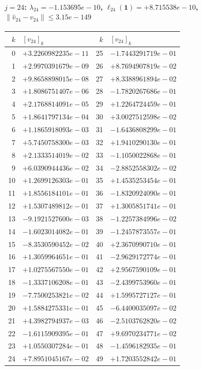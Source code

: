 \documentclass[11pt]{article}
\begin{document}
\paragraph{$j = 24$: $\lambda_{24} = -1.153695e-10$, \quad $\ell_{24}(\mathbf{1}) = +8.715538e-10$, \quad $\|\hat v_{24} - v_{24}\| \leq 3.15e-149$}
\begin{center}
{\footnotesize
\begin{tabular}{r@{\;\;}l@{\quad}r@{\;\;}l}
\toprule
$k$ & $[v_{24}]_k$ & $k$ & $[v_{24}]_k$ \\
\midrule
0 & $+3.2260982235e-11$ & 25 & $-1.7443291719e-01$ \\
1 & $+2.9970391679e-09$ & 26 & $+8.7694907819e-02$ \\
2 & $+9.8658898015e-08$ & 27 & $+8.3388961894e-02$ \\
3 & $+1.8086751407e-06$ & 28 & $-1.7820267686e-01$ \\
4 & $+2.1768814091e-05$ & 29 & $+1.2264724459e-01$ \\
5 & $+1.8641797134e-04$ & 30 & $+3.0027512598e-02$ \\
6 & $+1.1865918093e-03$ & 31 & $-1.6436808299e-01$ \\
7 & $+5.7450758300e-03$ & 32 & $+1.9410290130e-01$ \\
8 & $+2.1333514019e-02$ & 33 & $-1.1050022868e-01$ \\
9 & $+6.0390944436e-02$ & 34 & $-2.8852558302e-02$ \\
10 & $+1.2699126303e-01$ & 35 & $+1.4535253454e-01$ \\
11 & $+1.8556184101e-01$ & 36 & $-1.8320924090e-01$ \\
12 & $+1.5307489812e-01$ & 37 & $+1.3005851741e-01$ \\
13 & $-9.1921527600e-03$ & 38 & $-1.2257384996e-02$ \\
14 & $-1.6023014082e-01$ & 39 & $-1.2457873557e-01$ \\
15 & $-8.3530590452e-02$ & 40 & $+2.3670990710e-01$ \\
16 & $+1.3059964651e-01$ & 41 & $-2.9629172774e-01$ \\
17 & $+1.0275567550e-01$ & 42 & $+2.9567590109e-01$ \\
18 & $-1.3337106208e-01$ & 43 & $-2.4399753960e-01$ \\
19 & $-7.7500253821e-02$ & 44 & $+1.5995727127e-01$ \\
20 & $+1.5884275331e-01$ & 45 & $-6.4400035097e-02$ \\
21 & $+4.3982794937e-03$ & 46 & $-2.5103762820e-02$ \\
22 & $-1.6115909395e-01$ & 47 & $+9.6970234771e-02$ \\
23 & $+1.0550307284e-01$ & 48 & $-1.4596182935e-01$ \\
24 & $+7.8951045167e-02$ & 49 & $+1.7203552842e-01$ \\
\bottomrule
\end{tabular}
}
\end{center}
\end{document}
